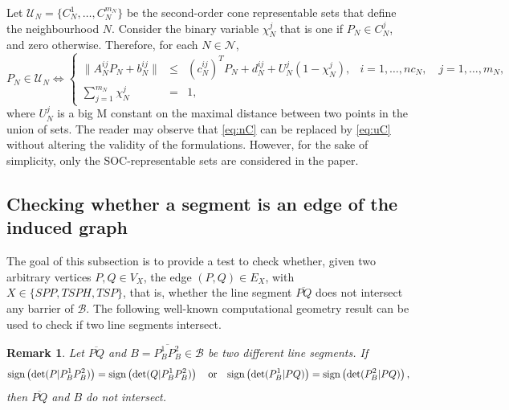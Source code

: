 \documentclass[a4paper,  review, authoryear, 1p.]{elsarticle}
\newtheorem{remark}{Remark}
\newcommand{\CV}[1]{{\color{red}#1}}
\newcommand{\determinant}[3]{\det({#1|#2#3})}
\begin{document}
	Let $\mathcal U_N=\{C^1_N, \ldots, C^{m_N}_N\}$ be the second-order cone representable sets that define the neighbourhood $N$. Consider the binary variable $\chi_{N}^{j}$ that is one if $P_N\in C^j_N$, and zero otherwise.
	Therefore, for each $N\in \mathcal N$,
	\begin{equation}\label{eq:uC}\tag{U-C}
		P_N\in \mathcal U_N \Longleftrightarrow
		\left\{
		\begin{array}{cclr}
			\|A_N^{ij} P_N + b_N^{ij}\|& \leq & (c_N^{ij})^T P_N + d_N^{ij}+ U_N^{j}(1-\chi_N^{j}), & i=1,\ldots,nc_N,\quad j=1,\ldots,m_N, \\
			\sum_{j = 1}^{m_N} \chi_N^{j} & =    & 1,
		\end{array}
		\right.
	\end{equation}
	where $U_N^j$ is a big M constant on the maximal distance between two points in the union of sets.
	\CV{The reader may observe that \eqref{eq:nC} can be replaced by \eqref{eq:uC} without altering the validity of the formulations. However, for the sake of simplicity, only the SOC-representable sets are considered in the paper.}
	
	
	\subsection{Checking whether a segment is an edge of the induced graph}
	
	The goal of this subsection is to provide a test to check whether, given two arbitrary vertices $P, Q\in V_X$, the edge $(P, Q)\in E_X$, with $X\in\{SPP, TSPH, TSP\}$, that is, whether the line segment $\overline{PQ}$ does not intersect any barrier of $\mathcal B$. The following well-known computational geometry result can be used to check if two line segments intersect.
	
	
	\begin{remark}\label{rem:determinants}
		Let $\overline{PQ}$ and $B=\overline{P_B^1P_B^2}\in\mathcal B$ be two different line segments. 
		If
		\begin{equation*}
			\normalfont{\text{sign}}\left(\determinant{P}{P_B^1}{P_B^2}\right) = \normalfont{\text{sign}}\left(\determinant{Q}{P_B^1}{P_B^2}\right)
			\quad
			\text{or}
			\quad
			\normalfont{\text{sign}}\left(\determinant{P_B^1}{P}{Q}\right) = \normalfont{\text{sign}}\left(\determinant{P_B^2}{P}{Q}\right)
			,
		\end{equation*}
		then $\overline{PQ}$ and $B$ do not intersect.
	\end{remark}
	
\end{document}
